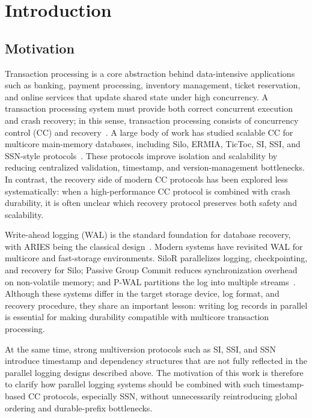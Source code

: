\section{Introduction}
\label{sec:introduction}

\subsection{Motivation}
\label{sec:introduction-motivation}

Transaction processing is a core abstraction behind data-intensive applications
such as banking, payment processing, inventory management, ticket reservation,
and online services that update shared state under high concurrency.  A
transaction processing system must provide both correct concurrent execution and
crash recovery; in this sense, transaction processing consists of concurrency
control (CC) and recovery~\cite{bernstein1987ccr}.  A large body of work has
studied scalable CC for multicore main-memory databases, including Silo, ERMIA,
TicToc, SI, SSI, and SSN-style protocols~\cite{tu2013silo,kim2016ermia,yu2016tictoc,ports2012ssi,wang2017ssn,tanabe2020ccbench}.
These protocols improve isolation and scalability by reducing centralized
validation, timestamp, and version-management bottlenecks.  In contrast, the
recovery side of modern CC protocols has been explored less systematically:
when a high-performance CC protocol is combined with crash durability, it is
often unclear which recovery protocol preserves both safety and scalability.

Write-ahead logging (WAL) is the standard foundation for database recovery, with
ARIES being the classical design~\cite{haerder1983principles,mohan1992aries}.
Modern systems have revisited WAL for multicore and fast-storage environments.
SiloR parallelizes logging, checkpointing, and recovery for Silo; Passive Group
Commit reduces synchronization overhead on non-volatile memory; and P-WAL
partitions the log into multiple streams~\cite{zheng2014silor,wang2014nvm,kamiya2017pwal}.
Although these systems differ in the target storage device, log format, and
recovery procedure, they share an important lesson: writing log records in
parallel is essential for making durability compatible with multicore
transaction processing.  

At the same time, strong multiversion protocols such as SI, SSI, and SSN introduce timestamp and dependency structures that are not fully reflected in the parallel logging designs described above.
%
The motivation of this work is therefore to clarify how parallel logging systems 
should be combined with such timestamp-based CC protocols, especially SSN, without unnecessarily reintroducing global ordering and durable-prefix bottlenecks.

